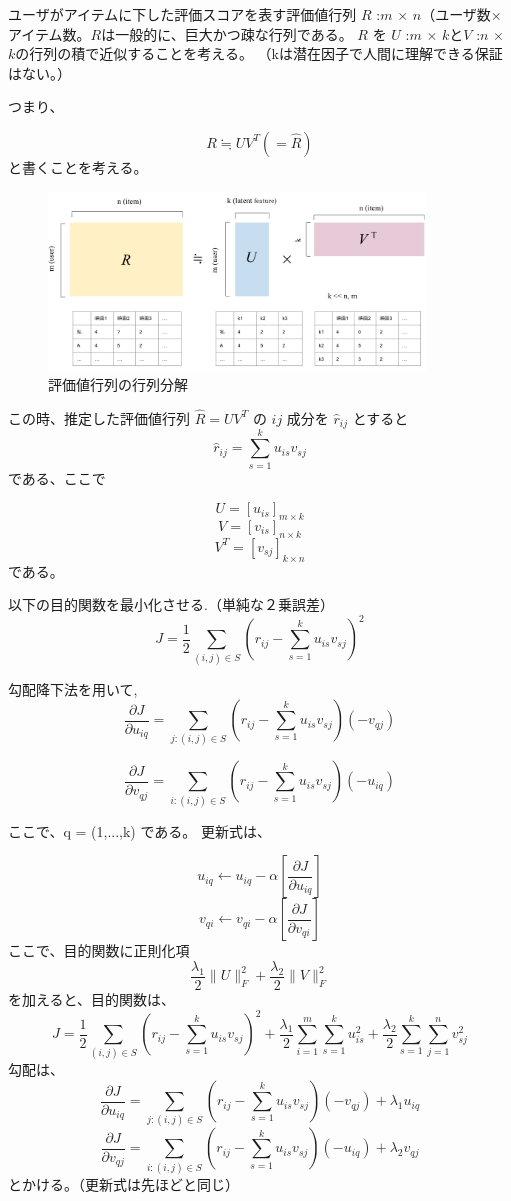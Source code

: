 \documentclass{jarticle}
\begin{document}
ユーザがアイテムに下した評価スコアを表す評価値行列 $R$ :$m$ $\times$ $n$（ユーザ数×アイテム数。$R$は一般的に、巨大かつ疎な行列である。 $R$ を $U$ :$m$ $\times$ $k$と$V$ :$n$ $\times$ $k$の行列の積で近似することを考える。
（kは潜在因子で人間に理解できる保証はない。）


つまり、

\[
 R \fallingdotseq U V^T (= \hat{R})
\]
と書くことを考える。

\begin{figure}[htbp]
  \begin{center}
  \includegraphics[width=100mm]{matrix_factorization.png}
  \caption{評価値行列の行列分解}
  \end{center}
  \end{figure}
  

この時、推定した評価値行列 $\hat{R} = UV^T$  の $ij$ 成分を $\hat{r}_{ij}$ とすると
\[
 \hat{r}_{ij} =  \sum_{s=1}^{k} u_{is} v_{sj} 
\]
である、ここで

\[
  U = [u_{is}]_{m \times k}
\]
\[
  V = [v_{is}]_{n \times k}
\]
\[
  V^T = [v_{sj}]_{k \times n}
\]
である。

\newpage

以下の目的関数を最小化させる.（単純な２乗誤差）
\[
  J = \frac{1}{2} \sum_{(i,j) \in S} (r_{ij} - \sum_{s=1}^{k} u_{is} v_{sj} )^2
\]

勾配降下法を用いて,
\[
\frac{\partial J}{\partial u_{iq}} = \sum_{j:(i,j) \in S} (r_{ij} - \sum_{s=1}^{k} u_{is} v_{sj} )(-v_{qj}) 
\]

\[
\frac{\partial J}{\partial v_{qj}} = \sum_{i:(i,j) \in S} (r_{ij} - \sum_{s=1}^{k} u_{is} v_{sj} )(-u_{iq}) 
\]

ここで、q = ({1,...,k}) である。
更新式は、

\[
  u_{iq} \longleftarrow u_{iq} - \alpha\left[\frac{\partial J}{\partial u_{iq}}\right]
\]
\[
  v_{qi} \longleftarrow v_{qi} - \alpha\left[\frac{\partial J}{\partial v_{qi}}\right]
\]
ここで、目的関数に正則化項 
\[
  \frac{\lambda_1}{2}\|U\|^2_F + \frac{\lambda_2}{2}\|V\|^2_F
\]
を加えると、目的関数は、
\[
  J = \frac{1}{2} \sum_{(i,j) \in S} (r_{ij} - \sum_{s=1}^{k} u_{is} v_{sj} )^2 + \frac{\lambda_1}{2}\sum_{i=1}^{m}\sum_{s=1}^{k}u_{is}^2 + \frac{\lambda_2}{2}\sum_{s=1}^{k}\sum_{j=1}^{n}v_{sj}^2
\]
勾配は、
\[
\frac{\partial J}{\partial u_{iq}} = \sum_{j:(i,j) \in S} (r_{ij} - \sum_{s=1}^{k} u_{is} v_{sj} )(-v_{qj}) + \lambda_1 u_{iq}
\]
\[
\frac{\partial J}{\partial v_{qj}} = \sum_{i:(i,j) \in S} (r_{ij} - \sum_{s=1}^{k} u_{is} v_{sj} )(-u_{iq}) + \lambda_2 v_{qj}
\]
とかける。（更新式は先ほどと同じ）
\end{document}
